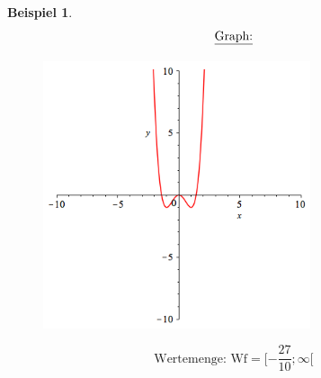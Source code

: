 \documentclass[a4paper,10pt]{report}
\newtheorem{myexample}{Beispiel}
\begin{document}
\begin{myexample}
\begin{eqnarray*}
		\shortintertext{\underline{Graph:}}
	\end{eqnarray*}
		\begin{figure}[H]
			\centering
			\includegraphics[width=0.7\textwidth]{images/x^4-2x^2.png}
		\end{figure}
		\begin{equation*}\text{Wertemenge: Wf}=[-\frac{27}{10}; \infty[\end{equation*}
\end{myexample}
\newpage

\newpage
\end{document}
